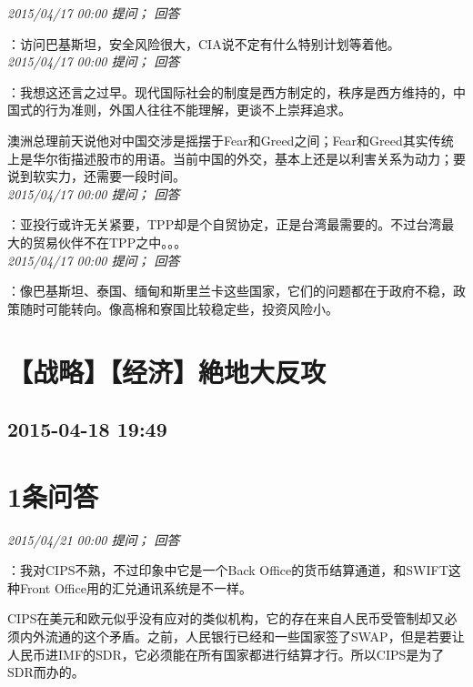 \documentclass[twocolumn]{ctexart}
\begin{document}
\textit{\hfill\noindent\small 2015/04/17 00:00 提问； 回答}

：访问巴基斯坦，安全风险很大，CIA说不定有什么特别计划等着他。\\

\textit{\hfill\noindent\small 2015/04/17 00:00 提问； 回答}

：我想这还言之过早。现代国际社会的制度是西方制定的，秩序是西方维持的，中国式的行为准则，外国人往往不能理解，更谈不上崇拜追求。

澳洲总理前天说他对中国交涉是摇摆于Fear和Greed之间；Fear和Greed其实传统上是华尔街描述股市的用语。当前中国的外交，基本上还是以利害关系为动力；要说到软实力，还需要一段时间。\\

\textit{\hfill\noindent\small 2015/04/17 00:00 提问； 回答}

：亚投行或许无关紧要，TPP却是个自贸协定，正是台湾最需要的。不过台湾最大的贸易伙伴不在TPP之中。。。\\

\textit{\hfill\noindent\small 2015/04/17 00:00 提问； 回答}

：像巴基斯坦、泰国、缅甸和斯里兰卡这些国家，它们的问题都在于政府不稳，政策随时可能转向。像高棉和寮国比较稳定些，投资风险小。\\


\section{【战略】【经济】絶地大反攻}
\subsection{2015-04-18 19:49}


\section{1条问答}

\textit{\hfill\noindent\small 2015/04/21 00:00 提问； 回答}

：我对CIPS不熟，不过印象中它是一个Back Office的货币结算通道，和SWIFT这种Front Office用的汇兑通讯系统是不一样。

CIPS在美元和欧元似乎没有应对的类似机构，它的存在来自人民币受管制却又必须内外流通的这个矛盾。之前，人民银行已经和一些国家签了SWAP，但是若要让人民币进IMF的SDR，它必须能在所有国家都进行结算才行。所以CIPS是为了SDR而办的。
\end{document}
